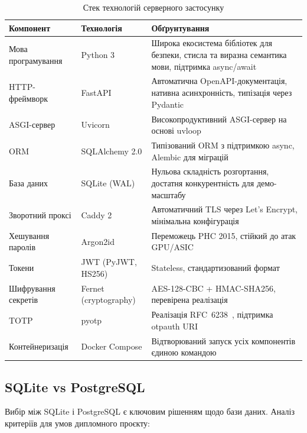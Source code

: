 \begin{table}[htbp]
\caption{Стек технологій серверного застосунку}
\label{tab:tech_stack}
\begin{tabularx}{\textwidth}{|l|l|X|}
\hline
\textbf{Компонент} & \textbf{Технологія} & \textbf{Обґрунтування} \\
\hline
Мова програмування & Python 3 & Широка екосистема бібліотек для безпеки, стисла та виразна семантика мови, підтримка async/await \\
\hline
HTTP-фреймворк & FastAPI & Автоматична OpenAPI-документація, нативна асинхронність, типізація через Pydantic \\
\hline
ASGI-сервер & Uvicorn & Високопродуктивний ASGI-сервер на основі uvloop \\
\hline
ORM & SQLAlchemy 2.0 & Типізований ORM з підтримкою async, Alembic для міграцій \\
\hline
База даних & SQLite (WAL) & Нульова складність розгортання, достатня конкурентність для демо-масштабу \\
\hline
Зворотний проксі & Caddy 2 & Автоматичний TLS через Let's Encrypt, мінімальна конфігурація \\
\hline
Хешування паролів & Argon2id & Переможець PHC 2015, стійкий до атак GPU/ASIC \\
\hline
Токени & JWT (PyJWT, HS256) & Stateless, стандартизований формат~\cite{rfc7519} \\
\hline
Шифрування секретів & Fernet (cryptography) & AES-128-CBC + HMAC-SHA256, перевірена реалізація \\
\hline
TOTP & pyotp & Реалізація RFC~6238~\cite{rfc6238}, підтримка otpauth URI \\
\hline
Контейнеризація & Docker Compose & Відтворюваний запуск усіх компонентів єдиною командою \\
\hline
\end{tabularx}
\end{table}

\subsection{SQLite vs PostgreSQL}

Вибір між SQLite і PostgreSQL є ключовим рішенням щодо бази даних.
Аналіз критеріїв для умов дипломного проєкту:

